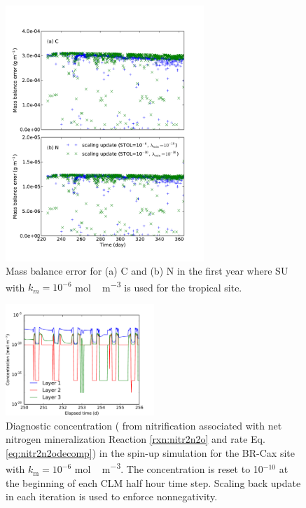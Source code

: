 \documentclass[gmd, manuscript]{copernicus}
\begin{document}
\begin{figure}[t]
\includegraphics[width=7.5cm]{../figs/fig17/mbe.pdf}
\caption{Mass balance error for (a) C and (b) N in the first year where SU with
$k_m = 10^{-6}$ \unit{mol\,m^{-3}} is used for the tropical site.}
\label{fig:mbe}
\end{figure}

\begin{figure}[t]
\includegraphics[width=0.5\textwidth]{../figs/fig15/caxn2o.pdf}
\caption{Diagnostic  concentration ( from nitrification
associated with net nitrogen mineralization Reaction \ref{rxn:nitr2n2o} and
rate Eq. \ref{eq:nitr2n2odecomp}) in the spin-up simulation for the BR-Cax site
with $k_\text{m} = 10^{-6}$ \unit{mol\,m^{-3}}. The concentration is reset to
10$^{-10}$ at the beginning of each CLM half hour time step. Scaling back
update in each iteration is used to enforce nonnegativity.}
\label{fig:caxn2o}
\end{figure}

\end{document}
